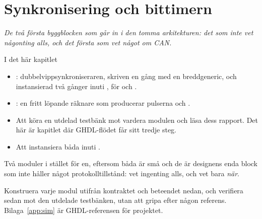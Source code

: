 
\chapter{Synkronisering och bittimern}
\label{c12:ch}

{\large\itshape De två första byggblocken som går in i den tomma arkitekturen: det som inte vet
någonting alls, och det första som vet något om CAN.\par}

\begin{chapterbox}{I det här kapitlet}
\begin{itemize}
  \item {}: dubbelvippsynkroniseraren, skriven en gång med en breddgeneric, och
    instansierad två gånger inuti , för  och .
  \item {}: en fritt löpande räknare som producerar pulserna  och
    .
  \item Att köra en utdelad testbänk mot vardera modulen och läsa dess rapport. Det här är kapitlet
    där GHDL-flödet får sitt tredje steg.
  \item Att instansiera båda inuti .
\end{itemize}
\end{chapterbox}

Två moduler i stället för en, eftersom båda är små och de är designens enda block som inte håller
något protokolltillstånd:  vet ingenting alls, och  vet bara
\emph{när}.

Konstruera varje modul utifrån kontraktet och beteendet nedan, och verifiera sedan mot den utdelade
testbänken, utan att gripa efter någon referens. Bilaga~\ref{app:sim} är GHDL-referensen för
projektet.





